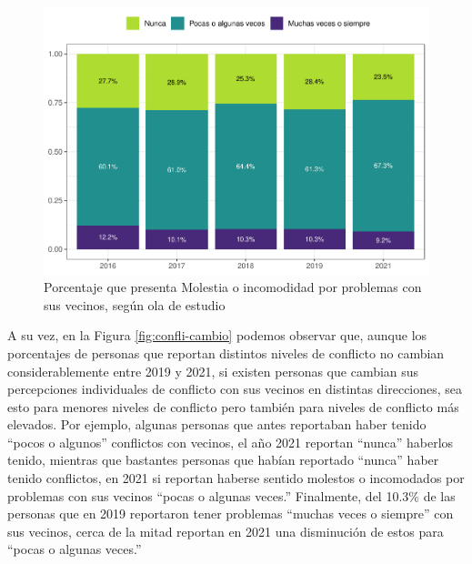 \documentclass[
  12pt,
]{book}
\begin{document}
\begin{figure}

{\centering \includegraphics{reporte-elsoc_files/figure-latex/confli-olas-1} 

}

\caption{Porcentaje que presenta Molestia o incomodidad por problemas con sus vecinos, según ola de estudio }\label{fig:confli-olas}
\end{figure}

A su vez, en la Figura \ref{fig:confli-cambio} podemos observar que, aunque los porcentajes de personas que reportan distintos niveles de conflicto no cambian considerablemente entre 2019 y 2021, si existen personas que cambian sus percepciones individuales de conflicto con sus vecinos en distintas direcciones, sea esto para menores niveles de conflicto pero también para niveles de conflicto más elevados. Por ejemplo, algunas personas que antes reportaban haber tenido ``pocos o algunos'' conflictos con vecinos, el año 2021 reportan ``nunca'' haberlos tenido, mientras que bastantes personas que habían reportado ``nunca'' haber tenido conflictos, en 2021 si reportan haberse sentido molestos o incomodados por problemas con sus vecinos ``pocas o algunas veces.'' Finalmente, del 10.3\% de las personas que en 2019 reportaron tener problemas ``muchas veces o siempre'' con sus vecinos, cerca de la mitad reportan en 2021 una disminución de estos para ``pocas o algunas veces.''
\end{document}
